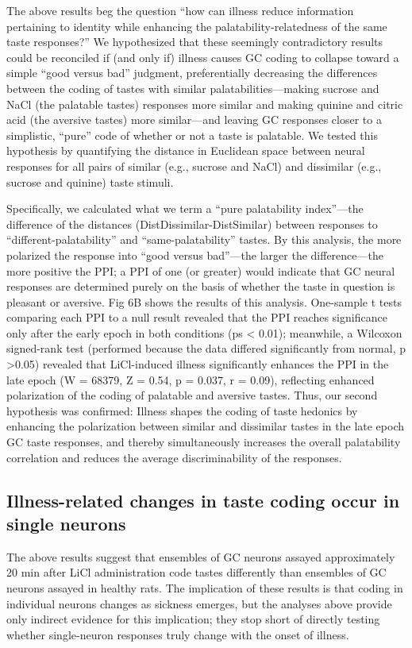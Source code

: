 \begin{refsection}
{The above results beg the question “how can illness reduce information pertaining to identity while enhancing the palatability-relatedness of the same taste responses?” We hypothesized that these seemingly contradictory results could be reconciled if (and only if) illness causes GC coding to collapse toward a simple “good versus bad” judgment, preferentially decreasing the differences between the coding of tastes with similar palatabilities—making sucrose and NaCl (the palatable tastes) responses more similar and making quinine and citric acid (the aversive tastes) more similar—and leaving GC responses closer to a simplistic, “pure” code of whether or not a taste is palatable. We tested this hypothesis by quantifying the distance in Euclidean space between neural responses for all pairs of similar (e.g., sucrose and NaCl) and dissimilar (e.g., sucrose and quinine) taste stimuli.

Specifically, we calculated what we term a “pure palatability index”—the difference of the distances (DistDissimilar-DistSimilar) between responses to “different-palatability” and “same-palatability” tastes. By this analysis, the more polarized the response into “good versus bad”—the larger the difference—the more positive the PPI; a PPI of one (or greater) would indicate that GC neural responses are determined purely on the basis of whether the taste in question is pleasant or aversive. Fig 6B shows the results of this analysis. One-sample t tests comparing each PPI to a null result revealed that the PPI reaches significance only after the early epoch in both conditions (ps < 0.01); meanwhile, a Wilcoxon signed-rank test (performed because the data differed significantly from normal, p >0.05) revealed that LiCl-induced illness significantly enhances the PPI in the late epoch (W = 68379, Z = 0.54, p = 0.037, r = 0.09), reflecting enhanced polarization of the coding of palatable and aversive tastes. Thus, our second hypothesis was confirmed: Illness shapes the coding of taste hedonics by enhancing the polarization between similar and dissimilar tastes in the late epoch GC taste responses, and thereby simultaneously increases the overall palatability correlation and reduces the average discriminability of the responses.

\subsection{Illness-related changes in taste coding occur in single neurons}
The above results suggest that ensembles of GC neurons assayed approximately 20 min after LiCl administration code tastes differently than ensembles of GC neurons assayed in healthy rats. The implication of these results is that coding in individual neurons changes as sickness emerges, but the analyses above provide only indirect evidence for this implication; they stop short of directly testing whether single-neuron responses truly change with the onset of illness.

}
\end{refsection}
